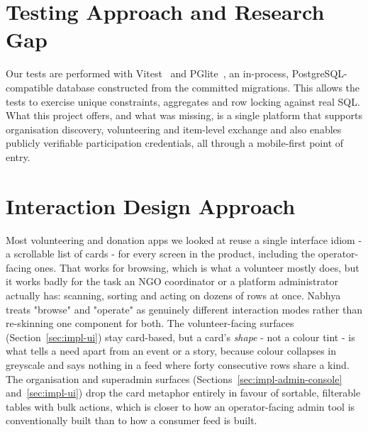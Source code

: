 \section{Testing Approach and Research Gap}
Our tests are performed with Vitest~\cite{vitest} and PGlite~\cite{pglite}, an in-process, PostgreSQL-compatible database constructed from the committed migrations. This allows the tests to exercise unique constraints, aggregates and row locking against real SQL. What this project offers, and what was missing, is a single platform that supports organisation discovery, volunteering and item-level exchange and also enables publicly verifiable participation credentials, all through a mobile-first point of entry.

\section{Interaction Design Approach}
\label{sec:lit-interaction-design}
Most volunteering and donation apps we looked at reuse a single interface idiom - a scrollable list of cards - for every screen in the product, including the operator-facing ones. That works for browsing, which is what a volunteer mostly does, but it works badly for the task an NGO coordinator or a platform administrator actually has: scanning, sorting and acting on dozens of rows at once. Nabhya treats "browse" and "operate" as genuinely different interaction modes rather than re-skinning one component for both. The volunteer-facing surfaces (Section~\ref{sec:impl-ui}) stay card-based, but a card's \emph{shape} - not a colour tint - is what tells a need apart from an event or a story, because colour collapses in greyscale and says nothing in a feed where forty consecutive rows share a kind. The organisation and superadmin surfaces (Sections~\ref{sec:impl-admin-console} and~\ref{sec:impl-ui}) drop the card metaphor entirely in favour of sortable, filterable tables with bulk actions, which is closer to how an operator-facing admin tool is conventionally built than to how a consumer feed is built.

